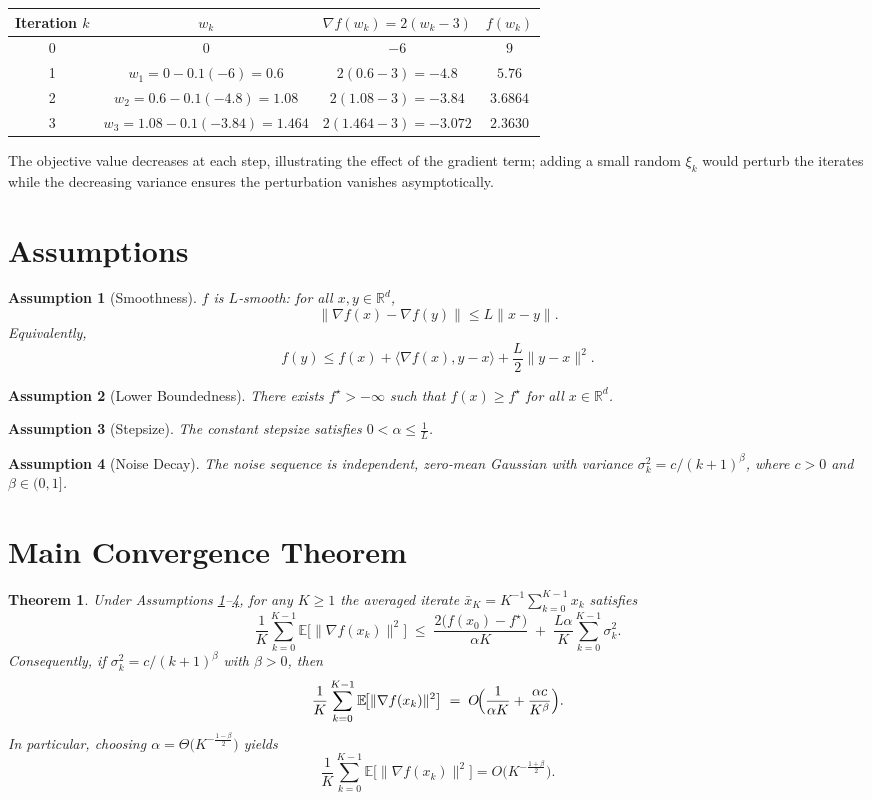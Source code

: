 \documentclass[11pt]{article}
\newtheorem{theorem}{Theorem}
\newtheorem{assumption}{Assumption}
\newcommand{\E}{\mathbb{E}}
\newcommand{\R}{\mathbb{R}}
\begin{document}
\begin{center}
\begin{tabular}{c|c|c|c}
Iteration $k$ & $w_{k}$ & $\nabla f(w_{k})=2(w_{k}-3)$ & $f(w_{k})$\\ \hline
0 & $0$ & $-6$ & $9$\\
1 & $w_{1}=0-0.1(-6)=0.6$ & $2(0.6-3)=-4.8$ & $5.76$\\
2 & $w_{2}=0.6-0.1(-4.8)=1.08$ & $2(1.08-3)=-3.84$ & $3.6864$\\
3 & $w_{3}=1.08-0.1(-3.84)=1.464$ & $2(1.464-3)=-3.072$ & $2.3630$\\
\end{tabular}
\end{center}
The objective value decreases at each step, illustrating the effect of the gradient term; adding a small random $\xi_{k}$ would perturb the iterates while the decreasing variance ensures the perturbation vanishes asymptotically.

\newpage

\section*{Assumptions}
\begin{assumption}[Smoothness]\label{ass:smooth}
$f$ is $L$‑smooth: for all $x,y\in\R^{d}$,
\[
\|\nabla f(x)-\nabla f(y)\| \le L\|x-y\|.
\]
Equivalently,
\[
f(y)\le f(x)+\langle\nabla f(x),y-x\rangle+\frac{L}{2}\|y-x\|^{2}.
\]
\end{assumption}
\begin{assumption}[Lower Boundedness]\label{ass:lb}
There exists $f^{\star}>-\infty$ such that $f(x)\ge f^{\star}$ for all $x\in\R^{d}$.
\end{assumption}
\begin{assumption}[Stepsize]\label{ass:step}
The constant stepsize satisfies $0<\alpha\le \frac{1}{L}$.
\end{assumption}
\begin{assumption}[Noise Decay]\label{ass:noise}
The noise sequence is independent, zero‑mean Gaussian with variance $\sigma_{k}^{2}=c/(k+1)^{\beta}$, where $c>0$ and $\beta\in(0,1]$.
\end{assumption}

\section*{Main Convergence Theorem}
\begin{theorem}\label{thm:main}
Under Assumptions \ref{ass:smooth}–\ref{ass:noise}, for any $K\ge 1$ the averaged iterate $\bar x_{K}=K^{-1}\sum_{k=0}^{K-1}x_{k}$ satisfies
\[
\frac{1}{K}\sum_{k=0}^{K-1}\E\!\bigl[\|\nabla f(x_{k})\|^{2}\bigr]
\;\le\;
\frac{2\bigl(f(x_{0})-f^{\star}\bigr)}{\alpha K}
\;+\;
\frac{L\alpha}{K}\sum_{k=0}^{K-1}\sigma_{k}^{2}.
\]
Consequently, if $\sigma_{k}^{2}=c/(k+1)^{\beta}$ with $\beta>0$, then
\[
\frac{1}{K}\sum_{k=0}^{K-1}\E\!\bigl[\|\nabla f(x_{k})\|^{2}\bigr]
\;=\;O\!\Bigl(\frac{1}{\alpha K}+\frac{\alpha c}{K^{\beta}}\Bigr).
\]
In particular, choosing $\alpha =\Theta\bigl(K^{-\frac{1-\beta}{2}}\bigr)$ yields
\[
\frac{1}{K}\sum_{k=0}^{K-1}\E\!\bigl[\|\nabla f(x_{k})\|^{2}\bigr]=O\!\bigl(K^{-\frac{1+\beta}{2}}\bigr).
\]
\end{theorem}
\end{document}
